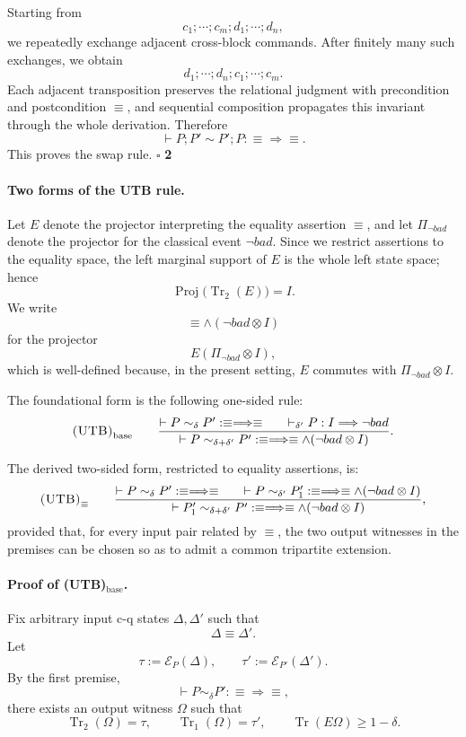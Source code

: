 \documentclass{report}
\theoremstyle{defn_style}
\begin{document}
\smallskip
\noindent
Starting from
\[
c_1;\cdots;c_m;d_1;\cdots;d_n,
\]
we repeatedly exchange adjacent cross-block commands. After finitely many such
exchanges, we obtain
\[
d_1;\cdots;d_n;c_1;\cdots;c_m.
\]
Each adjacent transposition preserves the relational judgment with precondition
and postcondition $\equiv$, and sequential composition propagates this invariant
through the whole derivation. Therefore
\[
\vdash P;P' \sim P';P : \equiv \Longrightarrow \equiv .
\]
This proves the swap rule.
\hfill$\square$
\textbf{2}

\paragraph{Two forms of the UTB rule.}
Let $E$ denote the projector interpreting the equality assertion $\equiv$,
and let $\Pi_{\neg bad}$ denote the projector for the classical event $\neg bad$.
Since we restrict assertions to the equality space, the left marginal support
of $E$ is the whole left state space; hence
\[
\operatorname{Proj}\!\bigl(\operatorname{Tr}_2(E)\bigr)=I.
\]
We write
\[
\equiv \wedge (\neg bad \otimes I)
\]
for the projector
\[
E(\Pi_{\neg bad}\otimes I),
\]
which is well-defined because, in the present setting, $E$ commutes with
$\Pi_{\neg bad}\otimes I$.

\medskip
\noindent
The foundational form is the following one-sided rule:
\[
\textsc{(UTB)}_{\mathrm{base}}
\qquad
\frac{
\vdash P \sim_{\delta} P' : \equiv \Longrightarrow \equiv
\qquad
\vdash_{\delta'} P : I \Longrightarrow \neg bad
}{
\vdash P \sim_{\delta+\delta'} P' : \equiv \Longrightarrow \equiv \wedge (\neg bad \otimes I)
}.
\]

\medskip
\noindent
The derived two-sided form, restricted to equality assertions, is:
\[
\textsc{(UTB)}_{\equiv}
\qquad
\frac{
\vdash P \sim_{\delta} P' : \equiv \Longrightarrow \equiv
\qquad
\vdash P \sim_{\delta'} P'_1 : \equiv \Longrightarrow \equiv \wedge (\neg bad \otimes I)
}{
\vdash P'_1 \sim_{\delta+\delta'} P' : \equiv \Longrightarrow \equiv \wedge (\neg bad \otimes I)
},
\]
provided that, for every input pair related by $\equiv$, the two output witnesses
in the premises can be chosen so as to admit a common tripartite extension.

\paragraph{Proof of \textsc{(UTB)}$_{\mathrm{base}}$.}
Fix arbitrary input c-q states $\Delta,\Delta'$ such that
\[
\Delta \mathrel{\equiv} \Delta'.
\]
Let
\[
\tau := \mathcal{E}_{P}(\Delta),
\qquad
\tau' := \mathcal{E}_{P'}(\Delta').
\]
By the first premise,
\[
\vdash P \sim_{\delta} P' : \equiv \Longrightarrow \equiv,
\]
there exists an output witness $\Omega$ such that
\[
\operatorname{Tr}_2(\Omega)=\tau,
\qquad
\operatorname{Tr}_1(\Omega)=\tau',
\qquad
\operatorname{Tr}(E\Omega)\ge 1-\delta.
\]
\end{document}
